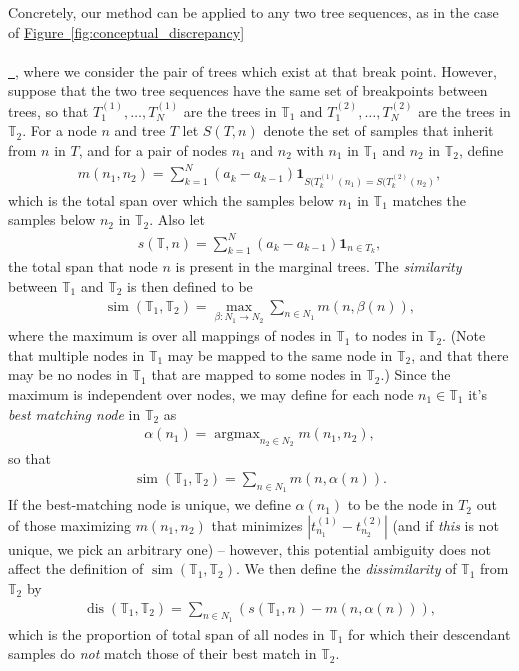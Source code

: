 \documentclass[10pt,twoside,lineno]{gsajnl}
\newcommand{\T}{\mathbb{T}}
\newcommand{\ind}{\mathbf{1}}
\newcommand{\argmax}{\operatorname{argmax}}
\newcommand{\dis}{\operatorname{dis}}
\newcommand{\similarity}{\operatorname{sim}}
\newcommand*{\figref}[2][]{%
	\hyperref[{#2}]{%
		Figure~\ref*{#2}%
		\ifx\\#1\\%
		\else
		\,#1%
		\fi
	}%
}
\begin{document}
Concretely, our method can be applied to any two tree sequences,
 as in the case of \figref{fig:conceptual_discrepancy},
 where we consider the pair of trees which exist at that break point.
However, suppose that the two tree sequences have the same set of breakpoints
between trees,
so that $T_1^{(1)}, \ldots, T_N^{(1)}$ are the trees in $\T_1$
and $T_1^{(2)}, \ldots, T_N^{(2)}$ are the trees in $\T_2$.
For a node $n$ and tree $T$
let $S(T, n)$ denote the set of samples that inherit from $n$ in $T$,
and for a pair of nodes $n_1$ and $n_2$ with $n_1$ in $\T_1$ and $n_2$ in $\T_2$,
define
\begin{align*}
    m(n_1, n_2)
    =
    \sum_{k=1}^N (a_k - a_{k-1}) \ind_{S(T^{(1)}_k(n_1) = S(T^{(2)}_k(n_2)} ,
\end{align*}
which is the total span over which the samples below $n_1$ in $\T_1$
matches the samples below $n_2$ in $\T_2$.
Also let
\begin{align*}
    s(\T, n) = \sum_{k=1}^N (a_k - a_{k-1}) \ind_{n \in T_k} ,
\end{align*}
the total span that node $n$ is present in the marginal trees.
The \emph{similarity} between $\T_1$ and $\T_2$ is then defined to be
\begin{align*}
    \similarity(\T_1, \T_2)
    =
    \max_{\beta:N_1 \to N_2} \sum_{n \in N_1} m(n, \beta(n)) ,
\end{align*}
where the maximum is over all mappings of nodes in $\T_1$ to nodes in $\T_2$.
(Note that multiple nodes in $\T_1$ may be mapped to the same node in $\T_2$,
and that there may be no nodes in $\T_1$ that are mapped to some nodes in $\T_2$.)
Since the maximum is independent over nodes, we may define for each node $n_1 \in \T_1$
it's \emph{best matching node} in $\T_2$ as
\begin{align*}
    \alpha(n_1) = \argmax_{n_2 \in N_2} m(n_1, n_2) ,
\end{align*}
so that
\begin{align*}
    \similarity(\T_1, \T_2)
    =
    \sum_{n \in N_1} m(n, \alpha(n)) .
\end{align*}
If the best-matching node is unique, we define $\alpha(n_1)$ to be the node in $T_2$
out of those maximizing $m(n_1, n_2)$ that minimizes $|t^{(1)}_{n_1} - t^{(2)}_{n_2}|$
(and if \emph{this} is not unique, we pick an arbitrary one) --
however, this potential ambiguity does not affect the definition of $\similarity(\T_1, \T_2)$.
We then define the \emph{dissimilarity} of $\T_1$ from $\T_2$ by
\begin{align*}
    \dis(\T_1, \T_2)
    =
    \sum_{n \in N_1} (s(\T_1, n) - m(n, \alpha(n))),
\end{align*}
which is the proportion of total span of all nodes in $\T_1$
for which their descendant samples do \emph{not} match those of their best match in $\T_2$.
\end{document}
